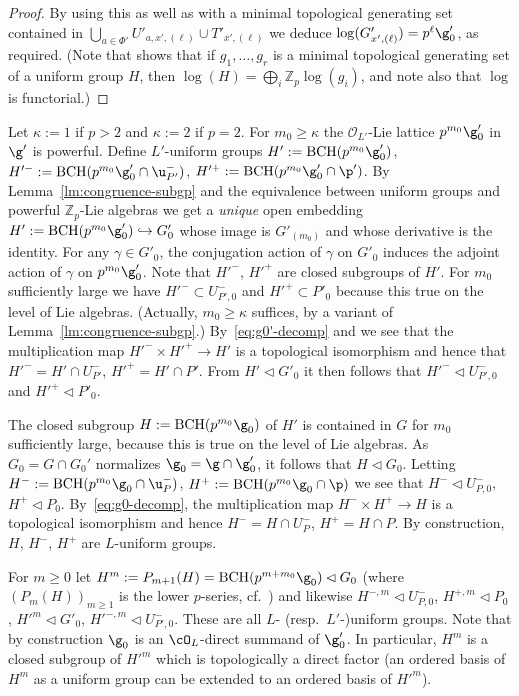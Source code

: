 \documentclass[a4paper]{amsart}
\numberwithin{equation}{section}
\theoremstyle{remark}
\theoremstyle{definition}
\newcommand{\Z}{\mathbb{Z}}
\DeclareMathOperator{\BCH}{BCH}
\newcommand{\into}{\hookrightarrow}
\begin{document}
\begin{proof}
  By using this as well as \cite[Theorem 4.17]{DDMS}
  with a minimal topological generating set contained in $\bigcup_{a \in \Phi'} U'_{a,x',(\ell)} \cup T'_{x',(\ell)}$ we deduce 
  $\log(G'_{x',(\ell)}) = p^\ell \g'_0$, as required.
  (Note that \cite[Theorem 4.17]{DDMS} shows that if $g_1,\dots,g_r$ is a minimal topological generating set of a uniform group
  $H$, then $\log(H) = \bigoplus_i \Z_p \log(g_i)$, and note also that $\log$ is functorial.)
\end{proof}

Let $\kappa := 1$ if $p > 2$ and $\kappa := 2$ if $p = 2$.
For $m_0 \ge \kappa$ the $\mathcal O_{L'}$-Lie lattice $p^{m_0} \g_0'$ in $\g'$ is powerful.
Define $L'$-uniform groups $H' := \BCH(p^{m_0} \g_0')$, $H'^- := \BCH(p^{m_0} \g_0' \cap \u_{P'}^-)$, $H'^+ := \BCH(p^{m_0} \g_0' \cap \p')$.
By Lemma~\ref{lm:congruence-subgp} and the equivalence between uniform groups and powerful $\Z_p$-Lie algebras we get a \emph{unique} open embedding $H' := \BCH(p^{m_0} \g_0') \into G'_0$ whose image is $G'_{(m_0)}$ and whose derivative is the identity.
For any $\gamma \in G'_0$, the conjugation action of $\gamma$ on $G'_0$ induces the adjoint action of $\gamma$ on $p^{m_0} \g_0'$.
Note that $H'^-$, $H'^+$ are closed subgroups of $H'$.
For $m_0$ sufficiently large we have $H'^- \subset U_{P',0}^-$ and $H'^+ \subset P'_0$ because this true on the level of Lie algebras.
(Actually, $m_0 \ge \kappa$ suffices, by a variant of Lemma~\ref{lm:congruence-subgp}.)
By~\eqref{eq:g0'-decomp} and \cite[Theorem 9.8]{DDMS} we see that the multiplication map  $H'^- \times H'^+ \to H'$ is a topological isomorphism and hence that $H'^- = H' \cap U_{P'}^-$, $H'^+ = H' \cap P'$.
From $H' \lhd G'_0$ it then follows that $H'^- \lhd U^-_{P',0}$ and $H'^+ \lhd P'_0$.

The closed subgroup $H := \BCH(p^{m_0} \g_0)$ of $H'$ is contained in $G$
for $m_0$ sufficiently large, because this is true on the level of Lie algebras.
As $G_0 = G \cap G_0'$ normalizes $\g_0 = \g \cap \g_0'$, it follows that $H\lhd G_0$.
Letting $H^- := \BCH(p^{m_0} \g_0 \cap \u_P^-)$, $H^+ := \BCH(p^{m_0} \g_0 \cap \p)$ we see that $H^- \lhd U_{P,0}^-$, $H^+ \lhd P_0$.
By~\eqref{eq:g0-decomp}, the multiplication map $H^- \times H^+ \to H$ is a topological isomorphism and hence $H^- = H \cap U_{P}^-$, $H^+ = H \cap P$.
By construction, $H$, $H^-$, $H^+$ are $L$-uniform groups.


For $m \ge 0$ let $H^m := P_{m+1}(H) = \BCH(p^{m+m_0} \g_0) \lhd G_0$ (where $(P_m(H))_{m \ge 1}$ is the lower $p$-series, cf.\ \cite[Definition 1.15]{DDMS}) and likewise $H^{-,m}\lhd U_{P,0}^-$, $H^{+,m}\lhd P_0$,
$H'^m\lhd G'_0$, $H'^{-,m}\lhd U^-_{P',0}$. These are all $L$- (resp.\ $L'$-)uniform groups. Note that by construction
$\g_0$ is an $\cO_L$-direct summand of $\g_0'$.
In particular, $H^m$ is a closed subgroup of $H'^m$ which is topologically a direct factor (an ordered basis of $H^m$ as a uniform
group can be extended to an ordered basis of $H'^m$).
\end{document}
